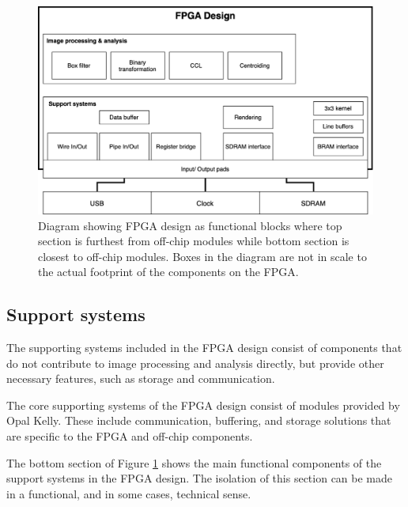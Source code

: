 \documentclass[12pt]{report}
\begin{document}
\begin{figure}[h]
    \centering
    \includegraphics[scale=0.25]{figures/fpga_design.png}
    \caption{Diagram showing FPGA design as functional blocks where top section is furthest from off-chip modules while bottom section is closest to off-chip modules. Boxes in the diagram are not in scale to the actual footprint of the components on the FPGA.}
    \label{fig:fpga_design}
\end{figure}

\subsection{Support systems}
The supporting systems included in the FPGA design consist of components that do not contribute to image processing and analysis directly, but provide other necessary features, such as storage and communication. 
\par
The core supporting systems of the FPGA design consist of modules provided by Opal Kelly. These include communication, buffering, and storage solutions that are specific to the FPGA and off-chip components. 
\par
The bottom section of Figure \ref*{fig:fpga_design} shows the main functional components of the support systems in the FPGA design. The isolation of this section can be made in a functional, and in some cases, technical sense.
\end{document}
